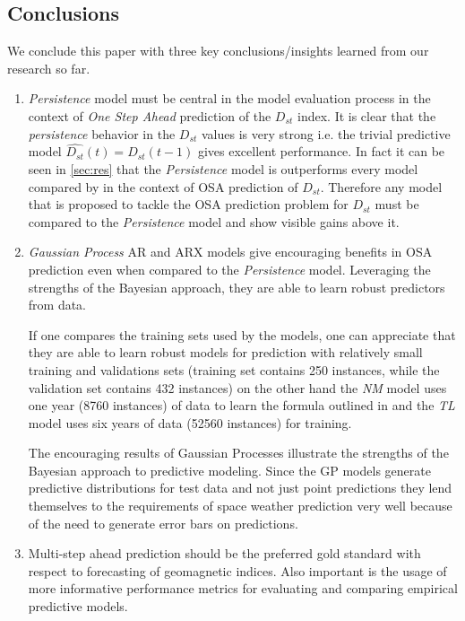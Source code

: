 \documentclass[referee,a4paper,12pt,traditabstract]{swsc}
\begin{document}
\begin{linenumbers}
\section{Conclusions}

We conclude this paper with three key conclusions/insights learned from our research so far.
   \begin{enumerate}
      \item \emph{Persistence} model must be central in the model evaluation process in the context of \emph{One Step Ahead} prediction of the $D_{st}$ index. It is clear that the \emph{persistence} behavior in the $D_{st}$ values is very strong i.e. the trivial predictive model $\hat{D_{st}}(t) = D_{st}(t-1)$ gives excellent performance. In fact it can be seen in \ref{sec:res} that the \emph{Persistence} model is outperforms every model compared by \citet{Ji2012} in the context of OSA prediction of $D_{st}$. Therefore any model that is proposed to tackle the OSA prediction problem for $D_{st}$ must be compared to the \emph{Persistence} model and show visible gains above it.
      
      \item \emph{Gaussian Process} AR and ARX models give encouraging benefits in OSA prediction even when compared to the \emph{Persistence} model. Leveraging the strengths of the Bayesian approach, they are able to learn robust predictors from data. 
      
      If one compares the training sets used by the models, one can appreciate that they are able to learn robust models for prediction with relatively small training and validations sets (training set contains 250 instances, while the validation set contains 432 instances) on the other hand the \emph{NM} model uses one year (8760 instances) of data to learn the formula outlined in \citet{balikhin:narmax} and the \emph{TL} model uses six years of data (52560 instances) for training. 
      
      The encouraging results of Gaussian Processes illustrate the strengths of the Bayesian approach to predictive modeling. Since the GP models generate predictive distributions for test data and not just point predictions they lend themselves to the requirements of space weather prediction very well because of the need to generate error bars on predictions.

      \item Multi-step ahead prediction should be the preferred gold standard with respect to forecasting of geomagnetic indices. Also important is the usage of more informative performance metrics for evaluating and comparing empirical predictive models.
   \end{enumerate}


\end{linenumbers}
\end{document}
